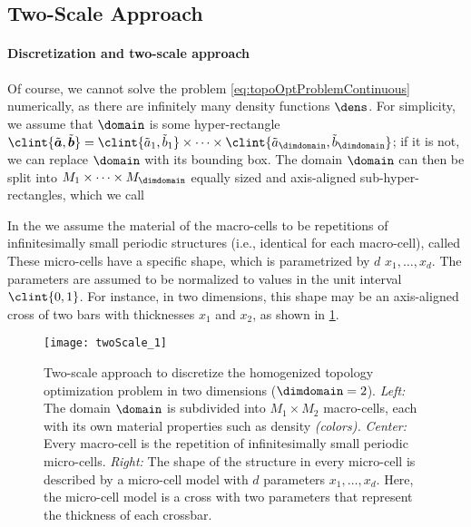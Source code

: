 \subsection{Two-Scale Approach}
\label{sec:612twoScale}

\paragraph{Discretization and two-scale approach}

Of course, we cannot solve the problem \eqref{eq:topoOptProblemContinuous}
numerically,
as there are infinitely many density functions $\dens$.
For simplicity, we assume that $\domain$ is some hyper-rectangle
$\clint{\tilde{\*a}, \tilde{\*b}}
= \clint{\tilde{a}_1, \tilde{b}_1} \times \dotsb \times
\clint{\tilde{a}_{\dimdomain}, \tilde{b}_{\dimdomain}}$;
if it is not, we can replace $\domain$ with its bounding box.
The domain $\domain$ can then be split into
$M_1 \times \dotsb \times M_{\dimdomain}$
equally sized and axis-aligned sub-hyper-rectangles,
which we call 

In the 
we assume the material of the macro-cells to be
repetitions of infinitesimally small periodic structures
(i.e., identical for each macro-cell),
called 
These micro-cells have a specific shape, which is parametrized by
$d$  $x_1, \dotsc, x_d$.
The parameters are assumed to be normalized to values in the
unit interval $\clint{0, 1}$.
For instance, in two dimensions,
this shape may be an axis-aligned cross of two bars
with thicknesses $x_1$ and $x_2$, as shown in \cref{fig:twoScale}.

\begin{figure}
  \texttt{[image: twoScale\_1]}%
  \caption[%
    Two-scale approach for topology optimization%
  ]{%
    Two-scale approach to discretize the homogenized topology
    optimization problem in two dimensions ($\dimdomain = 2$).
    \emph{Left:} The domain $\domain$ is subdivided into $M_1 \times M_2$
    macro-cells, each with its own material properties such as density
    \emph{(colors).}
    \emph{Center:} Every macro-cell is the repetition of infinitesimally small
    periodic micro-cells.
    \emph{Right:} The shape of the structure in every micro-cell is
    described by a micro-cell model with $d$ parameters $x_1, \dotsc, x_d$.
    Here, the micro-cell model is a cross with two parameters
    that represent the thickness of each crossbar.%
  }%
  \label{fig:twoScale}%
\end{figure}

